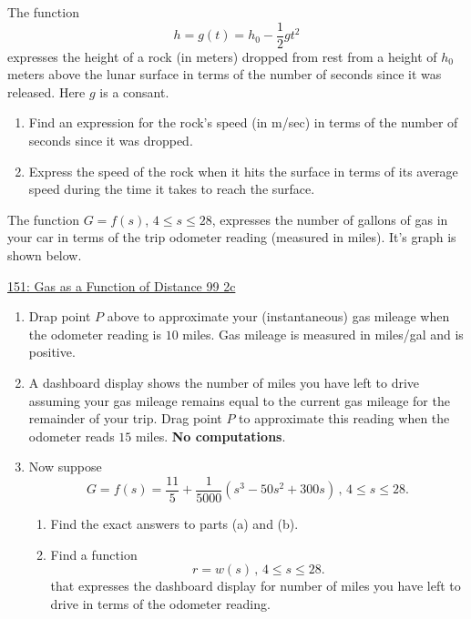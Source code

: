 \documentclass{ximera}
\begin{document}
\begin{question} \label{Qpfp3r398}
The function 
\[
  h = g(t) = h_0 - \frac{1}{2}g t^2 
\]
expresses the height of a rock (in meters) dropped from rest from a height of $h_0$ meters above the lunar surface in terms of the number of seconds since it was released.  Here $g$ is a consant.

\begin{enumerate}
\item Find an expression for the rock's speed (in m/sec) in terms of the number of seconds since it was dropped.

\item Express the speed of the rock when it hits the surface in terms of its average speed during the time it takes to reach the surface.
\end{enumerate}

\end{question}


\begin{question} \label{Qpf3e332}
The function $G=f(s)$, $4\leq s \leq 28$, expresses the number of gallons of gas in your car in terms of the trip odometer reading (measured in miles). It's graph is shown below.

\begin{onlineOnly}
    \begin{center}
\end{center}
\end{onlineOnly}

\href{https://www.desmos.com/calculator/nnoxloqoro}{151: Gas as a Function of Distance 99 2c}


\begin{enumerate}
\item Drap point $P$ above to approximate your (instantaneous) gas mileage when the odometer reading is $10$ miles. Gas mileage is measured in miles/gal and is positive.

\item A dashboard display shows the number of miles you have left to drive assuming your gas mileage remains equal to the current gas mileage for the remainder of your trip. Drag point $P$ to approximate this reading when the odometer reads $15$ miles. {\bf No computations}.

\item Now suppose 
\[
 G  = f(s) = \frac{11}{5} + \frac{1}{5000} \left( s^3  - 50s^2 + 300s \right) \, , \, 4 \leq s \leq 28.
\]

\begin{enumerate}

\item Find the exact answers to parts (a) and (b).

\item Find a function 
\[
   r = w(s) \, , \, 4 \leq s \leq 28.
\]
that expresses the dashboard display for number of miles you have left to drive in terms of the odometer reading. 
\end{enumerate}
\end{enumerate}

\end{question}
\end{document}
